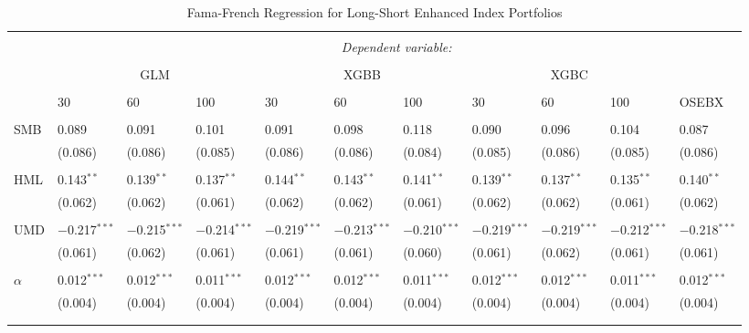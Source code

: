 \begin{table}[H] \centering 
  \caption{Fama-French Regression for Long-Short Enhanced Index Portfolios} 
  \label{table:FAMA-FRENCH-LONG-SHORT-ENHANCED-FINAL} 
\begin{tabularx}{\textwidth}{XXXXXXXXXXl} 
\\[-1.8ex]\hline 
\hline \\[-1.8ex] 
 & \multicolumn{10}{c}{\textit{Dependent variable:}} \\ 
\cline{2-11} 
\\[-1.8ex] 
 & \multicolumn{3}{c}{GLM} & \multicolumn{3}{c}{XGBB} & \multicolumn{3}{c}{XGBC} & \\
 \cline{2-11}
 \\[-1.8ex] 
 & 30 & 60 & 100 & 30 & 60 & 100 & 30 & 60 & 100 & OSEBX \\ 
 \cline{2-11} \\
 SMB & 0.089 & 0.091 & 0.101 & 0.091 & 0.098 & 0.118 & 0.090 & 0.096 & 0.104 & 0.087 \\ 
  & (0.086) & (0.086) & (0.085) & (0.086) & (0.086) & (0.084) & (0.085) & (0.086) & (0.085) & (0.086) \\ 
  & & & & & & & & & & \\ 
 HML & 0.143$^{**}$ & 0.139$^{**}$ & 0.137$^{**}$ & 0.144$^{**}$ & 0.143$^{**}$ & 0.141$^{**}$ & 0.139$^{**}$ & 0.137$^{**}$ & 0.135$^{**}$ & 0.140$^{**}$ \\ 
  & (0.062) & (0.062) & (0.061) & (0.062) & (0.062) & (0.061) & (0.062) & (0.062) & (0.061) & (0.062) \\ 
  & & & & & & & & & & \\ 
 UMD & $-$0.217$^{***}$ & $-$0.215$^{***}$ & $-$0.214$^{***}$ & $-$0.219$^{***}$ & $-$0.213$^{***}$ & $-$0.210$^{***}$ & $-$0.219$^{***}$ & $-$0.219$^{***}$ & $-$0.212$^{***}$ & $-$0.218$^{***}$ \\ 
  & (0.061) & (0.062) & (0.061) & (0.061) & (0.061) & (0.060) & (0.061) & (0.062) & (0.061) & (0.061) \\ 
  & & & & & & & & & & \\ 
 $\alpha$ & 0.012$^{***}$ & 0.012$^{***}$ & 0.011$^{***}$ & 0.012$^{***}$ & 0.012$^{***}$ & 0.011$^{***}$ & 0.012$^{***}$ & 0.012$^{***}$ & 0.011$^{***}$ & 0.012$^{***}$ \\ 
  & (0.004) & (0.004) & (0.004) & (0.004) & (0.004) & (0.004) & (0.004) & (0.004) & (0.004) & (0.004) \\ 
  & & & & & & & & & & \\ 
\hline \\[-1.8ex] 

\end{tabularx}
\end{table}
